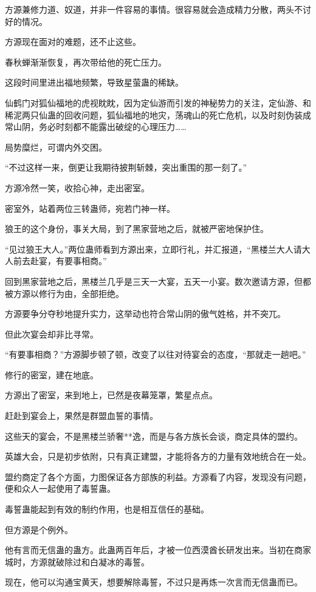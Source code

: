 \begin{this_body}
方源兼修力道、奴道，并非一件容易的事情。很容易就会造成精力分散，两头不讨好的情况。

方源现在面对的难题，还不止这些。

春秋蝉渐渐恢复，再次带给他的死亡压力。

这段时间里进出福地频繁，导致星萤蛊的稀缺。

仙鹤门对狐仙福地的虎视眈眈，因为定仙游而引发的神秘势力的关注，定仙游、和稀泥两只仙蛊的回收问题，狐仙福地的地灾，荡魂山的死亡危机，以及时刻伪装成常山阴，务必时刻都不能露出破绽的心理压力……

局势糜烂，可谓内外交困。

“不过这样一来，倒更让我期待披荆斩棘，突出重围的那一刻了。”

方源冷然一笑，收拾心神，走出密室。

密室外，站着两位三转蛊师，宛若门神一样。

狼王的这个身份，事关大局，到了黑家营地之后，就被严密地保护住。

“见过狼王大人。”两位蛊师看到方源出来，立即行礼，并汇报道，“黑楼兰大人请大人前去赴宴，有要事相商。”

回到黑家营地之后，黑楼兰几乎是三天一大宴，五天一小宴。数次邀请方源，但都被方源以修行为由，全部拒绝。

方源要争分夺秒地提升实力，这举动也符合常山阴的傲气姓格，并不突兀。

但此次宴会却非比寻常。

“有要事相商？”方源脚步顿了顿，改变了以往对待宴会的态度，“那就走一趟吧。”

修行的密室，建在地底。

方源出了密室，来到地上，已然是夜幕笼罩，繁星点点。

赶赴到宴会上，果然是群盟血誓的事情。

这些天的宴会，不是黑楼兰骄奢**逸，而是与各方族长会谈，商定具体的盟约。

英雄大会，只是初步依附，只有真正建盟，才能将各方的力量有效地统合在一处。

盟约商定了各个方面，力图保证各方部族的利益。方源看了内容，发现没有问题，便和众人一起使用了毒誓蛊。

毒誓蛊能起到有效的制约作用，也是相互信任的基础。

但方源是个例外。

他有言而无信蛊的蛊方。此蛊两百年后，才被一位西漠酋长研发出来。当初在商家城时，方源就破除过和白凝冰的毒誓。

现在，他可以沟通宝黄天，想要解除毒誓，不过只是再炼一次言而无信蛊而已。


\end{this_body}
